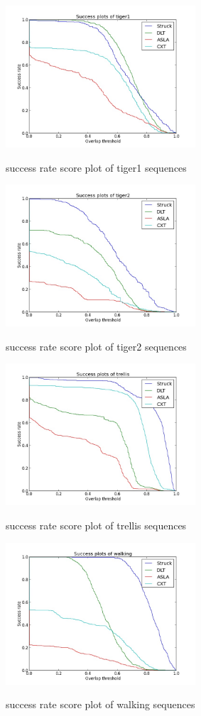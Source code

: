 \documentclass{acm_proc_article-sp}
\begin{document}
\begin{figure}[hbt]
    \includegraphics[width=200pt]{tiger1.jpg}
    \label{fig:tiger1}
    \caption{success rate score plot of tiger1 sequences}
\end{figure}

\begin{figure}[hbt]
    \includegraphics[width=200pt]{tiger2.jpg}
    \label{fig:tiger2}
    \caption{success rate score plot of tiger2 sequences}
\end{figure}

\begin{figure}[hbt]
    \includegraphics[width=200pt]{trellis.jpg}
    \label{fig:trellis}
    \caption{success rate score plot of trellis sequences}
\end{figure}

\begin{figure}[hbt]
    \includegraphics[width=200pt]{walking.jpg}
    \label{fig:walking}
    \caption{success rate score plot of walking sequences}
\end{figure}
\end{document}

